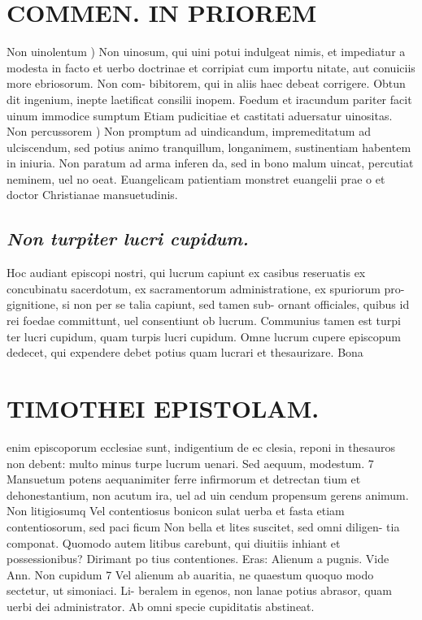 \documentclass{article}
\begin{document}
\begin{pages}
\section*{COMMEN. IN PRIOREM }
\marginpar{[ p.76 ]}\pstart Non uinolentum ) Non uinosum, qui uini potui indulgeat nimis, et impediatur a modesta in facto et uerbo doctrinae et corripiat cum importu nitate, aut conuiciis more ebriosorum. Non com- bibitorem, qui in aliis haec debeat corrigere. Obtun dit ingenium, inepte laetificat consilii inopem. Foedum et iracundum pariter facit uinum immodice sumptum Etiam pudicitiae et castitati aduersatur uinositas.  \pend\pstart Non percussorem ) Non promptum ad uindicandum, impremeditatum ad ulciscendum, sed potius animo tranquillum, longanimem, sustinentiam habentem in iniuria. Non paratum ad arma inferen da, sed in bono malum uincat, percutiat neminem, uel no oeat. Euangelicam patientiam monstret euangelii prae o et doctor Christianae mansuetudinis.  \pend
{}
{}
\subsection*{\textit{Non turpiter lucri cupidum. }}\pstart Hoc audiant episcopi nostri, qui lucrum capiunt ex casibus reseruatis ex concubinatu sacerdotum, ex sacramentorum administratione, ex spuriorum pro- gignitione, si non per se talia capiunt, sed tamen sub- ornant officiales, quibus id rei foedae committunt, uel consentiunt ob lucrum. Communius tamen est turpi ter lucri cupidum, quam turpis lucri cupidum. Omne lucrum cupere episcopum dedecet, qui expendere debet potius quam lucrari et thesaurizare. Bona  \pend
\section*{TIMOTHEI EPISTOLAM. }
\marginpar{[ p.77 ]}\pstart enim episcoporum ecclesiae sunt, indigentium de ec clesia, reponi in thesauros non debent: multo minus turpe lucrum uenari.  \pend\pstart Sed aequum, modestum. 7 Mansuetum potens aequanimiter ferre infirmorum et detrectan tium et dehonestantium, non acutum ira, uel ad uin cendum propensum gerens animum.  \pend\pstart Non litigiosumq Vel contentiosus bonicon sulat uerba et fasta etiam contentiosorum, sed paci ficum Non bella et lites suscitet, sed omni diligen- tia componat. Quomodo autem litibus carebunt, qui diuitiis inhiant et possessionibus? Dirimant po tius contentiones. Eras: Alienum a pugnis. Vide Ann. Non cupidum 7 Vel alienum ab auaritia, ne quaestum quoquo modo sectetur, ut simoniaci. Li- beralem in egenos, non lanae potius abrasor, quam uerbi dei administrator. Ab omni specie cupiditatis abstineat.  \pend
{}
{}

\end{pages}
\end{document}
